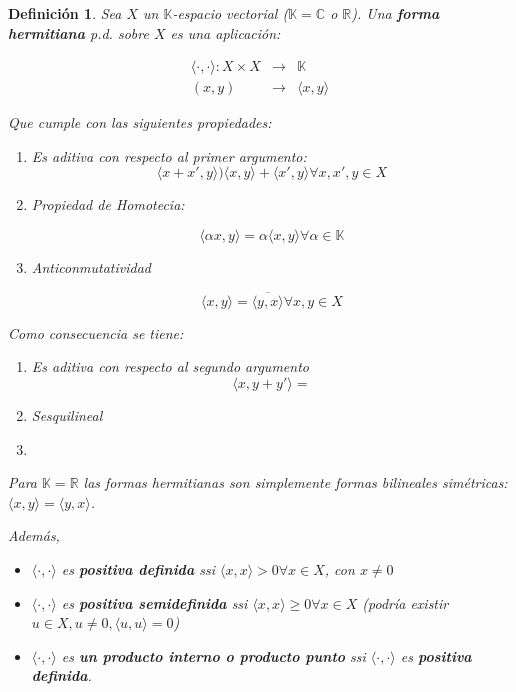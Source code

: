 \documentclass[12pt]{article}
\newtheorem*{mydef}{Definición}
\begin{document}
\begin{mydef}
Sea $X$ un $\mathbb{K}$-espacio vectorial ($\mathbb{K}=\mathbb{C}$ o $\mathbb{R}$). Una \textbf{forma hermitiana} p.d. sobre $X$ es una aplicación:

\begin{eqnarray*}
\langle \cdot, \cdot \rangle: X \times X &\rightarrow & \mathbb{K} \\
  (x,y)&\rightarrow & \langle x,y \rangle
\end{eqnarray*}

Que cumple con las siguientes propiedades:

\begin{enumerate}

\item Es aditiva con respecto al primer argumento:
$$ \langle x + x',y \rangle ) \langle x,y \rangle + \langle x',y \rangle \forall x,x',y \in X$$

\item Propiedad de Homotecia:

$$\langle \alpha x ,y \rangle = \alpha \langle x,y \rangle \forall \alpha \in \mathbb{K} $$

\item Anticonmutatividad

$$ \langle x,y \rangle = \overline{\langle y,x \rangle} \forall x,y \in X$$

\end{enumerate}


Como consecuencia se tiene:

\begin{enumerate}
\item Es aditiva con respecto al segundo argumento
$$\langle x,y + y' \rangle = $$

\item Sesquilineal

\item 
\end{enumerate}

Para $\mathbb{K}=\mathbb{R}$ las formas hermitianas son simplemente formas bilineales simétricas: $\langle x,y \rangle= \langle y,x \rangle$.

Además,

\begin{itemize}
\item $\langle \cdot, \cdot \rangle$ es \textbf{positiva definida}  ssi $\langle x,x \rangle > 0 \forall x \in X$, con $x \neq 0$

\item $\langle \cdot, \cdot \rangle$ es \textbf{positiva semidefinida}  ssi $\langle x,x \rangle \geq 0 \forall x \in X$ (podría existir $u \in X, u\neq 0, \langle u, u \rangle = 0 $)

\item $\langle \cdot, \cdot \rangle$  es \textbf{un producto interno o producto punto} ssi $\langle \cdot, \cdot \rangle$ es \textbf{positiva definida}.
\end{itemize}

\end{mydef}
\end{document}

